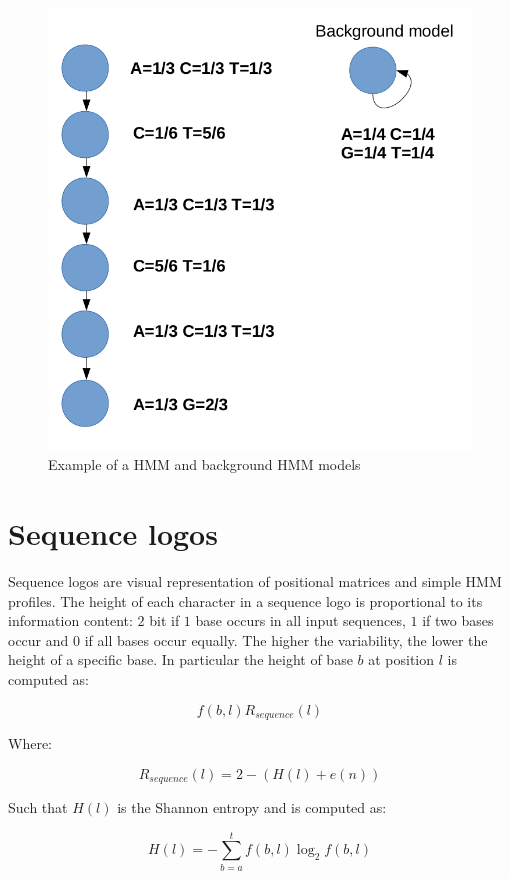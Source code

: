 		\begin{figure}
			\centering
			\includegraphics[scale=0.3]{HMM.png}
			\caption{Example of a HMM and background HMM models}
			\label{fig:HMM}
			\end{figure}
			
	\section{Sequence logos}
	Sequence logos are visual representation of positional matrices and simple HMM profiles.
	The height of each character in a sequence logo is proportional to its information content: $2$ bit if $1$ base occurs in all input sequences, $1$ if two bases occur and $0$ if all bases occur equally.
	The higher the variability, the lower the height of a specific base.
	In particular the height of base $b$ at position $l$ is computed as:

	$$f(b,l)R_{sequence}(l)$$

	Where:

	$$R_{sequence}(l) = 2-(H(l) + e(n))$$

	Such that $H(l)$ is the Shannon entropy and is computed as:

	$$H(l) = -\sum\limits_{b=a}^tf(b,l)\log_2 f(b,l)$$


